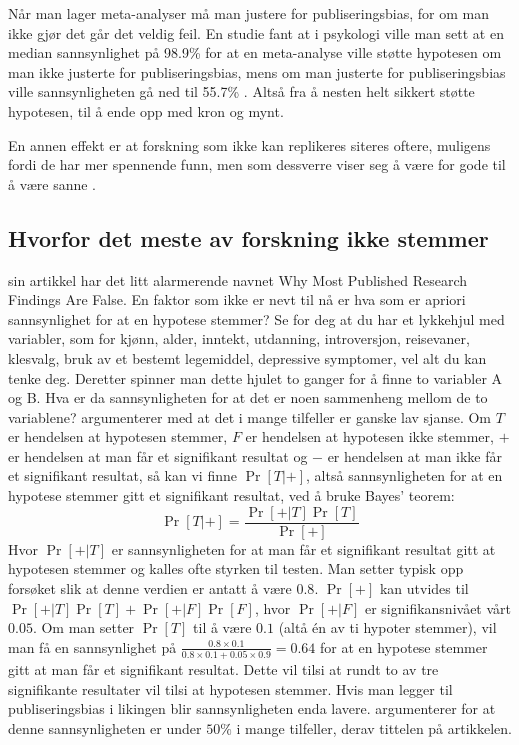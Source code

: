 \documentclass[doc,norsk]{apa7}
\begin{document}
Når man lager meta-analyser må man justere for publiseringsbias, for om man ikke gjør det går det veldig feil. En studie fant at i psykologi ville man sett at en median sannsynlighet på 98.9\% for at en meta-analyse ville støtte hypotesen om man ikke justerte for publiseringsbias, mens om man justerte for publiseringsbias ville sannsynligheten gå ned til 55.7\% \parencite{publiseringsbias-psykologi}. Altså fra å nesten helt sikkert støtte hypotesen, til å ende opp med kron og mynt.

En annen effekt er at forskning som ikke kan replikeres siteres oftere, muligens fordi de har mer spennende funn, men som dessverre viser seg å være for gode til å være sanne \parencite{falsk-sitert-mer}.

\subsection{Hvorfor det meste av forskning ikke stemmer}
\textcite{forskning-fake} sin artikkel har det litt alarmerende navnet \guillemetleft Why Most Published Research Findings Are False\guillemetright. En faktor som ikke er nevt til nå er hva som er apriori sannsynlighet for at en hypotese stemmer? Se for deg at du har et lykkehjul med variabler, som for kjønn, alder, inntekt, utdanning, introversjon, reisevaner, klesvalg, bruk av et bestemt legemiddel, depressive symptomer, vel alt du kan tenke deg. Deretter spinner man dette hjulet to ganger for å finne to variabler A og B. Hva er da sannsynligheten for at det er noen sammenheng mellom de to variablene? \textcite{forskning-fake} argumenterer med at det i mange tilfeller er ganske lav sjanse.
Om $T$ er hendelsen at hypotesen stemmer, $F$ er hendelsen at hypotesen ikke stemmer, $+$ er hendelsen at man får et signifikant resultat og $-$ er hendelsen at man ikke får et signifikant resultat, så kan vi finne $\Pr[T|+]$, altså sannsynligheten for at en hypotese stemmer gitt et signifikant resultat, ved å bruke Bayes' teorem:
\begin{equation*}
\Pr[T|+] = \frac{\Pr[+|T]\Pr[T]}{\Pr[+]}
\end{equation*}
Hvor $\Pr[+|T]$ er sannsynligheten for at man får et signifikant resultat gitt at hypotesen stemmer og kalles ofte styrken til testen. Man setter typisk opp forsøket slik at denne verdien er antatt å være $0.8$. $\Pr[+]$ kan utvides til $\Pr[+|T]\Pr[T] + \Pr[+|F]\Pr[F]$, hvor $\Pr[+|F]$ er signifikansnivået vårt $0.05$. Om man setter $\Pr[T]$ til å være $0.1$ (altå én av ti hypoter stemmer), vil man få en sannsynlighet på $\frac{0.8\times 0.1}{0.8\times 0.1 + 0.05\times 0.9} = 0.64$ for at en hypotese stemmer gitt at man får et signifikant resultat. Dette vil tilsi at rundt to av tre signifikante resultater vil tilsi at hypotesen stemmer. Hvis man legger til publiseringsbias i likingen blir sannsynligheten enda lavere. \textcite{forskning-fake} argumenterer for at denne sannsynligheten er under $50\%$ i mange tilfeller, derav tittelen på artikkelen.
\end{document}
